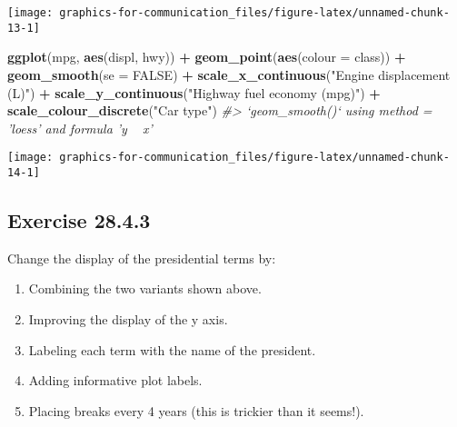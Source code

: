 \documentclass[]{book}
\newenvironment{Shaded}{\begin{snugshade}}{\end{snugshade}}
\newcommand{\CommentTok}[1]{\textcolor[rgb]{0.56,0.35,0.01}{\textit{#1}}}
\newcommand{\DataTypeTok}[1]{\textcolor[rgb]{0.13,0.29,0.53}{#1}}
\newcommand{\KeywordTok}[1]{\textcolor[rgb]{0.13,0.29,0.53}{\textbf{#1}}}
\newcommand{\NormalTok}[1]{#1}
\newcommand{\OperatorTok}[1]{\textcolor[rgb]{0.81,0.36,0.00}{\textbf{#1}}}
\newcommand{\OtherTok}[1]{\textcolor[rgb]{0.56,0.35,0.01}{#1}}
\newcommand{\StringTok}[1]{\textcolor[rgb]{0.31,0.60,0.02}{#1}}
\providecommand{\tightlist}{%
  \setlength{\itemsep}{0pt}\setlength{\parskip}{0pt}}
\theoremstyle{plain}
\theoremstyle{remark}
\begin{document}
\begin{center}\texttt{[image: graphics-for-communication\_files/figure-latex/unnamed-chunk-13-1]} \end{center}

\begin{Shaded}
\begin{Highlighting}[]
\KeywordTok{ggplot}\NormalTok{(mpg, }\KeywordTok{aes}\NormalTok{(displ, hwy)) }\OperatorTok{+}
\StringTok{  }\KeywordTok{geom_point}\NormalTok{(}\KeywordTok{aes}\NormalTok{(}\DataTypeTok{colour =}\NormalTok{ class)) }\OperatorTok{+}
\StringTok{  }\KeywordTok{geom_smooth}\NormalTok{(}\DataTypeTok{se =} \OtherTok{FALSE}\NormalTok{) }\OperatorTok{+}
\StringTok{  }\KeywordTok{scale_x_continuous}\NormalTok{(}\StringTok{"Engine displacement (L)"}\NormalTok{) }\OperatorTok{+}
\StringTok{  }\KeywordTok{scale_y_continuous}\NormalTok{(}\StringTok{"Highway fuel economy (mpg)"}\NormalTok{) }\OperatorTok{+}
\StringTok{  }\KeywordTok{scale_colour_discrete}\NormalTok{(}\StringTok{"Car type"}\NormalTok{)}
\CommentTok{#> `geom_smooth()` using method = 'loess' and formula 'y ~ x'}
\end{Highlighting}
\end{Shaded}

\begin{center}\texttt{[image: graphics-for-communication\_files/figure-latex/unnamed-chunk-14-1]} \end{center}

\hypertarget{exercise-28.4.3}{%
\subsection*{\texorpdfstring{Exercise
{28.4.3}}{Exercise 28.4.3}}\label{exercise-28.4.3}}

Change the display of the presidential terms by:

\begin{enumerate}
\def\labelenumi{\arabic{enumi}.}
\tightlist
\item
  Combining the two variants shown above.
\item
  Improving the display of the y axis.
\item
  Labeling each term with the name of the president.
\item
  Adding informative plot labels.
\item
  Placing breaks every 4 years (this is trickier than it seems!).
\end{enumerate}
\end{document}
